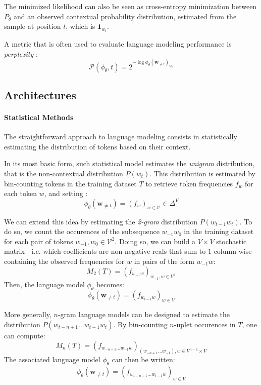 The minimized likelihood can also be seen as cross-entropy minimization between $P_\theta$ and an observed contextual probability distribution, estimated from the sample at position $t$, which is $\mathbf{1}_{w_t}$.

A metric that is often used to evaluate language modeling performance is \textit{perplexity} :
$$
\mathcal{P}(\phi_\theta, t) = 2^{-\log \phi_\theta(\mathbf{w}_{\neq t})_{w_t}}
$$


\subsection{Architectures}

\paragraph*{Statistical Methods}

The straightforward approach to language modeling consists in statistically estimating the distribution of tokens based on their context. 

In its most basic form, such statistical model estimates the \textit{unigram} distribution, that is the non-contextual distribution $P(w_t)$. This distribution is estimated by bin-counting tokens in the training dataset $T$ to retrieve token frequencies $f_w$ for each token $w$, and setting :
$$
\phi_{\theta}(\mathbf{w}_{\neq t}) = (f_w)_{w \in \mathcal{V}} \in \Delta^{V}
$$

We can extend this idea by estimating the \textit{2-gram} distribution $P(w_{t-1}w_t)$. To do so, we count the occurences of the subsequence $w_{-1} w_0$ in the training dataset for each pair of tokens $w_{-1}, w_0 \in \mathcal{V}^2$. Doing so, we can build a $V \times V$ stochastic matrix - i.e. which coefficients are non-negative reals that sum to $1$ column-wise - containing the observed frequencies for $w$ in pairs of the form $w_{-1} w$:
$$
M_2(T) = (f_{w_{-1} w})_{w_{-1}, w \in V^2}
$$
Then, the language model $\phi_{\theta}$ becomes:
$$
\phi_{\theta}(\mathbf{w}_{\neq t}) = (f_{w_{t-1} w})_{w \in V}
$$

More generally, $n$-gram language models \citep{jurafsky_course} can be designed to estimate the distribution $P(w_{t-n +1}...w_{t-1}w_t)$. By bin-counting $n$-uplet occurences in $T$, one can compute:
$$
M_n(T) = (f_{w_{-n+1}...w_{-1}w})_{(w_{-n+1}...w_{-1}), w \in V^{n-1} \times V}
$$
The associated language model $\phi_{\theta}$ can then be written:
$$
\phi_{\theta}(\mathbf{w}_{\neq t}) = (f_{w_{t-n+1}...w_{t-1} w})_{w \in V}
$$

